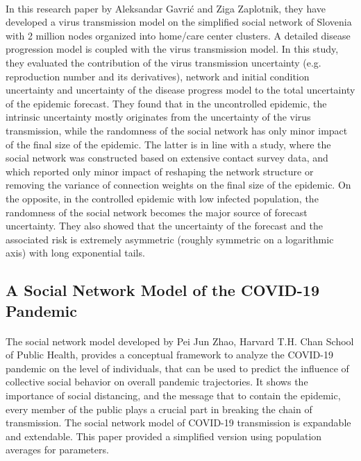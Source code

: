 \documentclass[14pt, a4paper]{extarticle}
\begin{document}
	        \paragraph{} In this research paper by Aleksandar Gavrić and Ziga Zaplotnik, they have developed a virus transmission model on the simplified social network of Slovenia with 2 million nodes organized into home/care center clusters. A detailed disease progression model is coupled with the virus transmission model. In this study, they evaluated the contribution of the virus transmission uncertainty (e.g. reproduction number and its derivatives), network and initial condition uncertainty and uncertainty of the disease progress model to the total uncertainty of the epidemic forecast. They found that in the uncontrolled epidemic, the intrinsic uncertainty mostly originates from the uncertainty of the virus transmission, while the randomness of the social network has only minor impact of the final size of the epidemic. The latter is in line with a study, where the social network was constructed based on extensive contact survey data, and which reported only minor impact of reshaping the network structure or removing the variance of connection weights on the final size of the epidemic. On the opposite, in the controlled epidemic with low infected population, the randomness of the social network becomes the major source of forecast uncertainty. They also showed that the uncertainty of the forecast and the associated risk is extremely asymmetric (roughly symmetric on a logarithmic axis) with long exponential tails.
	
	    \subsection{A Social Network Model of the COVID-19 Pandemic}
	        \paragraph{} The social network model developed by Pei Jun Zhao, Harvard T.H. Chan School of Public Health, provides a conceptual framework to analyze the COVID-19 pandemic on the level of individuals, that can be used to predict the influence of collective social behavior on overall pandemic trajectories. It shows the importance of social distancing, and the message that to contain the epidemic, every member of the public plays a crucial part in breaking the chain of transmission. The social network model of COVID-19 transmission is expandable and extendable. This paper provided a simplified version using population averages for parameters.
	
\end{document}
